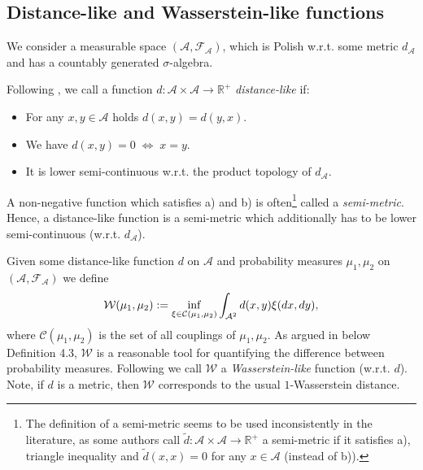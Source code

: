\documentclass[12pt]{article}
\theoremstyle{definition}
\renewcommand{\d}{{\rm d}}
\newcommand{\R}{\mathbb{R}}
\newcommand{\cA}{\mathcal{A}}
\begin{document}
\subsection{Distance-like and Wasserstein-like functions}
We consider a measurable space $(\mathcal{A}, \mathcal{F}_\mathcal{A})$, which is Polish w.r.t. some metric $d_\cA$ and has a countably generated $\sigma$-algebra. 

Following \cite{hairer2011asymptotic}, we call a function $d \colon \cA \times \cA \to \R^+$ \textit{distance-like} if: 
	\begin{itemize}
		\item[a)] For any $x,y\in \cA$ holds $d(x,y) = d(y,x)$. 
		\item[b)] We have $d(x,y) =0 \;\Longleftrightarrow \; x=y$.
		\item[c)] It is lower semi-continuous w.r.t. the product topology of $d_{\mathcal{A}}$.
	\end{itemize}
	
	A non-negative function which satisfies a) and b) is often\footnote{{The definition of a semi-metric seems to be used inconsistently in the literature, as some authors call $\widetilde{d} \colon \mathcal{A} \times \mathcal{A} \to \R^+$ a semi-metric if it satisfies a), triangle inequality and $\widetilde{d}(x,x) =0$ for any $x \in \mathcal{A}$ (instead of b)).}} called a \textit{semi-metric}. 
	Hence, a distance-like function is a semi-metric which additionally has to be lower semi-continuous (w.r.t. $d_{\mathcal{A}}$).

Given some distance-like function $d$ on $\cA$ and probability measures $\mu_1, \mu_2$ on $(\cA, \mathcal{F}_\cA)$ we define
\[
\mathcal{W}(\mu_1, \mu_2):=\inf_{\xi \in \mathcal{C}(\mu_1, \mu_2)} \int_{\cA^2} d(x,y) \xi(\d x , \d y) ,
\]
where $\mathcal{C}(\mu_1, \mu_2)$ is the set of all couplings of $\mu_1, \mu_2$.
As argued in \cite{hairer2011asymptotic} below Definition 4.3, $\mathcal{W}$ is a reasonable tool for quantifying the difference between probability measures.
Following \cite{hosseini2023spectral} we call $\mathcal{W}$ a \textit{Wasserstein-like} function (w.r.t. $d$).
Note, if $d$ is a metric, then $\mathcal{W}$ corresponds to the usual $1$-Wasserstein distance.
\end{document}
